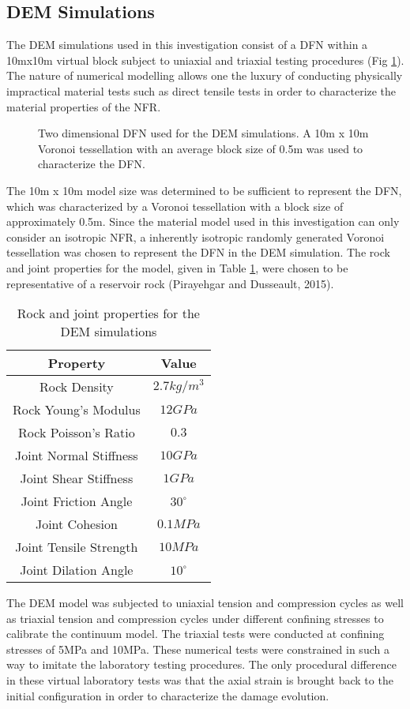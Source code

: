 \subsection{DEM Simulations}

The DEM simulations used in this investigation consist of a DFN within
a 10mx10m virtual block subject to uniaxial and triaxial testing
procedures (Fig \ref{fig:vorDFN}). The nature of numerical modelling
allows one the luxury of conducting physically impractical material
tests such as direct tensile tests in order to characterize the material
properties of the NFR.

\begin{figure}
\label{fig:vorDFN} \caption{Two dimensional DFN used for the DEM simulations. A 10m x 10m Voronoi
tessellation with an average block size of 0.5m was used to characterize
the DFN.}
\end{figure}


The 10m x 10m model size was determined to be sufficient to represent
the DFN, which was characterized by a Voronoi tessellation with a
block size of approximately 0.5m. Since the material model used in
this investigation can only consider an isotropic NFR, a inherently
isotropic randomly generated Voronoi tessellation was chosen to represent
the DFN in the DEM simulation. The rock and joint properties for the
model, given in Table \ref{tab:demProp}, were chosen to be representative
of a reservoir rock (Pirayehgar and Dusseault, 2015).

\begin{table}[!htbp]
\centering \caption{Rock and joint properties for the DEM simulations}
\label{tab:demProp} %
\begin{tabular}{c c}
\hline 
Property  & Value & \tabularnewline
\hline 
Rock Density  & $2.7kg/m^{3}$ & \tabularnewline
Rock Young's Modulus  & $12GPa$ & \tabularnewline
Rock Poisson's Ratio  & $0.3$ & \tabularnewline
Joint Normal Stiffness  & $10GPa$ & \tabularnewline
Joint Shear Stiffness  & $1GPa$ & \tabularnewline
Joint Friction Angle  & $30^{\circ}$ & \tabularnewline
Joint Cohesion  & $0.1MPa$ & \tabularnewline
Joint Tensile Strength  & $10MPa$ & \tabularnewline
Joint Dilation Angle  & $10^{\circ}$ & \tabularnewline
\hline 
\end{tabular}
\end{table}


The DEM model was subjected to uniaxial tension and compression cycles
as well as triaxial tension and compression cycles under different
confining stresses to calibrate the continuum model. The triaxial
tests were conducted at confining stresses of 5MPa and 10MPa. These
numerical tests were constrained in such a way to imitate the laboratory
testing procedures. The only procedural difference in these virtual
laboratory tests was that the axial strain is brought back to the
initial configuration in order to characterize the damage evolution.

